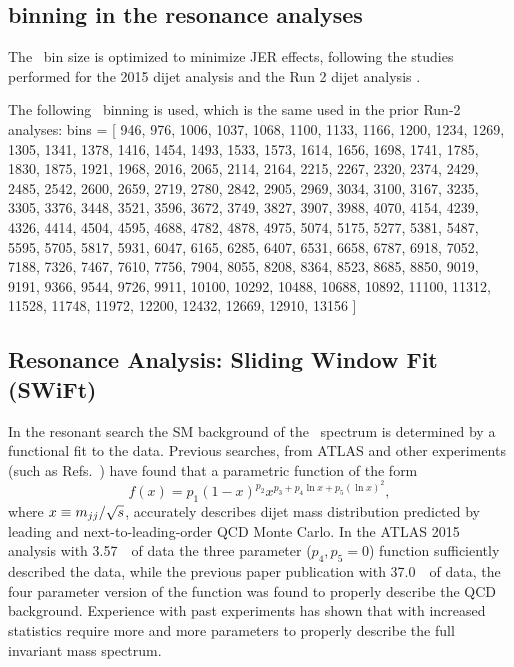 \label{sec:bckgdestimation}

\subsection{\mjj\xspace binning in the resonance analyses}

The \mjj\ bin size is optimized to minimize JER effects, following the studies
performed for the 2015 dijet analysis \cite{EXOT-2015-02} and the Run 2 dijet analysis \cite{Nishu:2646455}.

The following \mjj\ binning is used, which is the same used in the prior Run-2 analyses:
bins = [ 946, 976, 1006, 1037, 1068, 1100, 1133, 1166, 1200, 1234, 1269, 1305, 1341, 1378, 1416, 1454, 1493, 1533, 1573, 1614, 1656, 1698, 1741, 1785, 1830, 1875, 1921, 1968, 2016, 2065, 2114, 2164, 2215, 2267, 2320, 2374, 2429, 2485, 2542, 2600, 2659, 2719, 2780, 2842, 2905, 2969, 3034, 3100, 3167, 3235, 3305, 3376, 3448, 3521, 3596, 3672, 3749, 3827, 3907, 3988, 4070, 4154, 4239, 4326, 4414, 4504, 4595, 4688, 4782, 4878, 4975, 5074, 5175, 5277, 5381, 5487, 5595, 5705, 5817, 5931, 6047, 6165, 6285, 6407, 6531, 6658, 6787, 6918, 7052, 7188, 7326, 7467, 7610, 7756, 7904, 8055, 8208, 8364, 8523, 8685, 8850, 9019, 9191, 9366, 9544, 9726, 9911, 10100, 10292, 10488, 10688, 10892, 11100, 11312, 11528, 11748, 11972, 12200, 12432, 12669, 12910, 13156 ] ~\GeV\. \\

\subsection{Resonance Analysis: Sliding Window Fit (SWiFt)}
In the resonant search the SM background of the \mjj\ spectrum is determined by a functional fit to the data.
Previous searches, from ATLAS and other experiments (such as Refs.~\cite{Bagnaia:1984ip,PhysRevD.79.112002,EXOT-2010-01,CMS-EXO-10-010,EXOT-2010-07,EXOT-2013-11})
have found that a parametric function of the form
\begin{equation}
  f(x) = p_1 (1 - x)^{p_2} x^{p_3 + p_4\ln x + p_5 (\ln x)^2},
\label{Eq:fitfunction}
\end{equation}
where $x \equiv m_{jj} /\sqrt{s}$, accurately describes dijet mass distribution predicted by leading and next-to-leading-order QCD Monte Carlo.
In the ATLAS 2015 analysis with 3.57~\ifb\ of data the three parameter ($p_4, p_5 = 0$) function sufficiently described the data, while the previous paper publication with 37.0~\ifb\ of data, the four parameter version of the function was found to properly describe the QCD background.  Experience with past experiments has shown that with increased statistics require more and more parameters to properly describe the full invariant mass spectrum.

